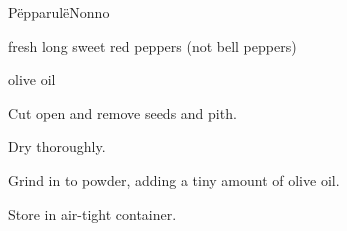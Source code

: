\begin{recipe}{P\"epparul\"e}{Nonno}{}

\begin{ingredients}
\item fresh long sweet red peppers (not bell peppers)
\item olive oil
\end{ingredients}

\begin{directions}
\item Cut open and remove seeds and pith.
\item Dry thoroughly.
\item Grind in to powder, adding a tiny amount of olive oil.
\item Store in air-tight container.
\end{directions}

\end{recipe}
